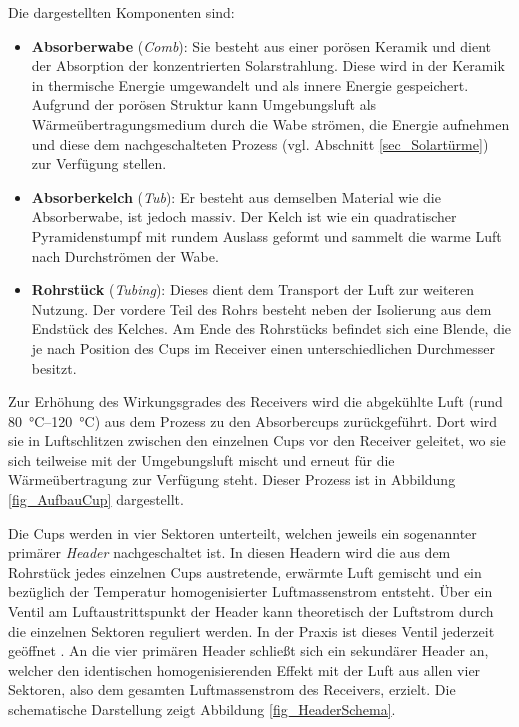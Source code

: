 Die dargestellten Komponenten sind:
\begin{itemize}
    \item \textbf{Absorberwabe} (\textit{Comb}): Sie besteht aus einer porösen Keramik und dient der Absorption der konzentrierten Solarstrahlung.
Diese wird in der Keramik in thermische Energie umgewandelt und als innere Energie gespeichert.
          Aufgrund der porösen Struktur kann Umgebungsluft als Wärmeübertragungsmedium durch die Wabe strömen, die Energie aufnehmen und diese dem nachgeschalteten Prozess (vgl. Abschnitt \ref{sec_Solartürme}) zur Verfügung stellen.
    \item \textbf{Absorberkelch} (\textit{Tub}): Er besteht aus demselben Material wie die Absorberwabe, ist jedoch massiv.
          Der Kelch ist wie ein quadratischer Pyramidenstumpf mit rundem Auslass geformt und sammelt die warme Luft nach Durchströmen der Wabe.
    \item \textbf{Rohrstück} (\textit{Tubing}): Dieses dient dem Transport der Luft zur weiteren Nutzung. Der vordere Teil des Rohrs besteht neben der Isolierung aus dem Endstück des Kelches. Am Ende des Rohrstücks befindet sich eine Blende, die je nach Position des Cups im Receiver einen unterschiedlichen Durchmesser besitzt.
\end{itemize}

Zur Erhöhung des Wirkungsgrades des Receivers wird die abgekühlte Luft (rund \SIrange{80}{120}{\degreeCelsius}) \cite{IdingSolarPaces} aus dem Prozess zu den Absorbercups zurückgeführt.
Dort wird sie in Luftschlitzen zwischen den einzelnen Cups vor den Receiver geleitet, wo sie sich teilweise mit der Umgebungsluft mischt und erneut für die Wärmeübertragung zur Verfügung steht.
Dieser Prozess ist in Abbildung \ref{fig_AufbauCup} dargestellt.

Die Cups werden in vier Sektoren unterteilt, welchen jeweils ein sogenannter primärer \textit{Header} nachgeschaltet ist.
In diesen Headern wird die aus dem Rohrstück jedes einzelnen Cups austretende, erwärmte Luft gemischt und ein bezüglich der Temperatur homogenisierter Luftmassenstrom entsteht.
Über ein Ventil am Luftaustrittspunkt der Header kann theoretisch der Luftstrom durch die einzelnen Sektoren reguliert werden.
In der Praxis ist dieses Ventil jederzeit geöffnet \cite{IdingSolarPaces}.
An die vier primären Header schließt sich ein sekundärer Header an, welcher den identischen homogenisierenden Effekt mit der Luft aus allen vier Sektoren, also dem gesamten Luftmassenstrom des Receivers, erzielt.
Die schematische Darstellung zeigt Abbildung \ref{fig_HeaderSchema}.

